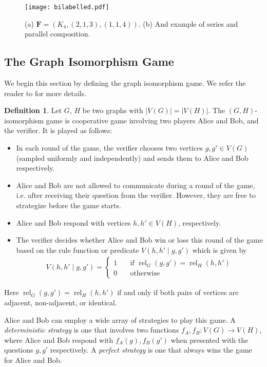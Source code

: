 \documentclass[11pt,a4paper]{article}
\theoremstyle{plain}
\theoremstyle{remark}
\theoremstyle{definition}
\newtheorem{definition}[thm]{Definition}
\DeclareMathOperator{\rel}{rel}
\newcommand{\card}[1]{\left\lvert #1 \right\rvert}
\begin{document}
\begin{figure}
  \centering
  \texttt{[image: bilabelled.pdf]} 
  \caption{(a) $\boldsymbol{F} = (K_4, (2,1,3), (1,1,4))$. (b) And example of series and parallel composition.}
  \label{fig:bilabelled}
\end{figure}


\subsection{The Graph Isomorphism Game}\label{sec:quant-iso-npa}

We begin this section by defining the graph isomorphism game. We refer the reader to \cite{ATSERIAS2019289} for more details. 

\begin{definition}
    Let $G$, $H$ be two graphs with $\card{V(G)} = \card{V(H)}$. The $(G,H)$-isomorphism game is cooperative game involving two players Alice and Bob, and the verifier. It is played as follows: 
\begin{itemize}
    \item In each round of the game, the verifier chooses two vertices $g, g' \in V(G)$ (sampled uniformly and independently) and sends them to Alice and Bob respectively. 
    \item Alice and Bob are not allowed to communicate during a round of the game, i.e. after receiving their question from the verifier. However, they are free to strategize before the game starts. 
    \item Alice and Bob respond with vertices $h, h' \in V(H)$, respectively. 
    \item The verifier decides whether Alice and Bob win or lose this round of the game based on the rule function or predicate $V(h,h'\mid g,g')$ which is given by
    \begin{align*}
        V(h,h'\mid g,g') = \begin{cases}
            1 &\quad \text{if } \rel_G(g,g') = \rel_H(h,h') \\
            0 &\quad \text{otherwise}
        \end{cases}
    \end{align*}
\end{itemize}
  Here $\rel_G(g,g') = \rel_H(h, h')$ if and only if both pairs of vertices are adjacent, non-adjacent, or identical.
\end{definition}

Alice and Bob can employ a wide array of strategies to play this game. A \emph{deterministic strategy} is one that involves two functions $f_A, f_B\colon  V(G) \to V(H)$, where Alice and Bob respond with $f_A(g), f_B(g')$ when presented with the questions $g,g'$ respectively. A \emph{perfect strategy} is one that always wins the game for Alice and Bob. 
\end{document}
